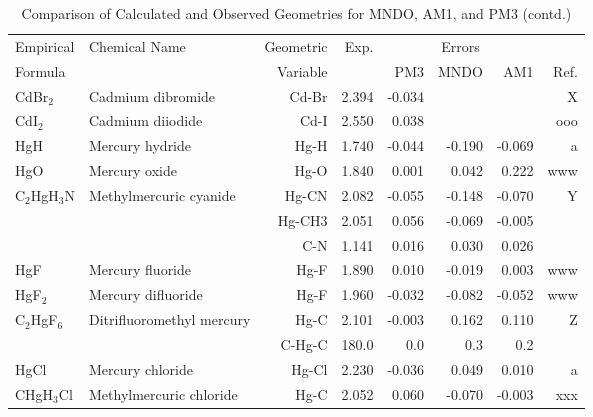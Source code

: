 \begin{table}
\caption{\label{geotabv}Comparison of Calculated and Observed Geometries for 
MNDO, AM1, and PM3 (contd.)}
\begin{center}
\compresstable
\begin{tabular}{llrrrrrr}
 Empirical  & Chemical Name &  Geometric &  Exp. & \multicolumn{3}{c}{Errors} & \\
  Formula   &               &  Variable &        & PM3  & MNDO  &  AM1 & Ref.\\
\hline
 CdBr$_2$       & Cadmium dibromide                  &Cd-Br          &     2.394   &    -0.034 &  &  &     X \\
 CdI$_2$        & Cadmium diiodide                   &Cd-I           &     2.550   &     0.038 &  &  &   ooo \\
 HgH         & Mercury hydride                    &Hg-H           &     1.740   &    -0.044 &    -0.190 &    -0.069 &     a \\
 HgO         & Mercury oxide                      &Hg-O           &     1.840   &     0.001 &     0.042 &     0.222 &   www \\
 C$_2$HgH$_3$N     & Methylmercuric cyanide             &Hg-CN          &     2.082   &    -0.055 &    -0.148 &    -0.070 &     Y \\
             &                                    &Hg-CH3         &     2.051   &     0.056 &    -0.069 &    -0.005 &       \\
             &                                    &C-N            &     1.141   &     0.016 &     0.030 &     0.026 &       \\
 HgF         & Mercury fluoride                   &Hg-F           &     1.890   &     0.010 &    -0.019 &     0.003 &   www \\
 HgF$_2$        & Mercury difluoride                 &Hg-F           &     1.960   &    -0.032 &    -0.082 &    -0.052 &   www \\
 C$_2$HgF$_6$      & Ditrifluoromethyl mercury          &Hg-C           &     2.101   &    -0.003 &     0.162 &     0.110 &     Z \\
             &                                    &C-Hg-C       &     180.0   &       0.0 &       0.3 &       0.2   &       \\
 HgCl        & Mercury chloride                   &Hg-Cl          &     2.230   &    -0.036 &     0.049 &     0.010 &     a \\
 CHgH$_3$Cl     & Methylmercuric chloride            &Hg-C           &     2.052   &     0.060 &    -0.070 &    -0.003 &   xxx \\

\end{tabular}
\end{center}
\end{table}
